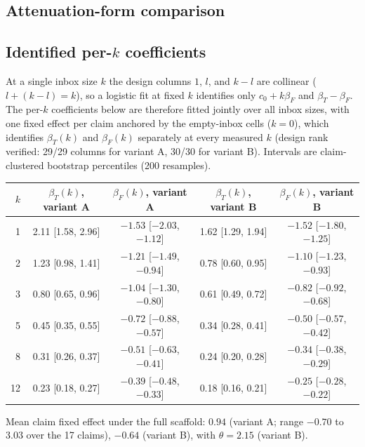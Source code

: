 \documentclass[11pt]{article}
\begin{document}
\subsection{Attenuation-form comparison}
\begin{center}

\end{center}

\subsection{Identified per-$k$ coefficients}

At a single inbox size $k$ the design columns $1$, $l$, and $k-l$ are
collinear ($l + (k-l) = k$), so a logistic fit at fixed $k$ identifies only
$c_0 + k\beta_F$ and $\beta_T - \beta_F$. The per-$k$ coefficients below are
therefore fitted jointly over all inbox sizes, with one fixed effect per claim
anchored by the empty-inbox cells ($k = 0$), which identifies
$\beta_T(k)$ and $\beta_F(k)$ separately at every measured $k$ (design rank
verified: 29/29 columns for variant A, 30/30 for variant B). Intervals are
claim-clustered bootstrap percentiles (200 resamples).

\begin{center}
\small
\begin{tabular}{rcccc}
\toprule
$k$ & $\beta_T(k)$, variant A & $\beta_F(k)$, variant A & $\beta_T(k)$, variant B & $\beta_F(k)$, variant B \\
\midrule
1  & 2.11 [1.58, 2.96] & $-1.53$ [$-2.03$, $-1.12$] & 1.62 [1.29, 1.94] & $-1.52$ [$-1.80$, $-1.25$] \\
2  & 1.23 [0.98, 1.41] & $-1.21$ [$-1.49$, $-0.94$] & 0.78 [0.60, 0.95] & $-1.10$ [$-1.23$, $-0.93$] \\
3  & 0.80 [0.65, 0.96] & $-1.04$ [$-1.30$, $-0.80$] & 0.61 [0.49, 0.72] & $-0.82$ [$-0.92$, $-0.68$] \\
5  & 0.45 [0.35, 0.55] & $-0.72$ [$-0.88$, $-0.57$] & 0.34 [0.28, 0.41] & $-0.50$ [$-0.57$, $-0.42$] \\
8  & 0.31 [0.26, 0.37] & $-0.51$ [$-0.63$, $-0.41$] & 0.24 [0.20, 0.28] & $-0.34$ [$-0.38$, $-0.29$] \\
12 & 0.23 [0.18, 0.27] & $-0.39$ [$-0.48$, $-0.33$] & 0.18 [0.16, 0.21] & $-0.25$ [$-0.28$, $-0.22$] \\
\bottomrule
\end{tabular}
\end{center}

Mean claim fixed effect under the full scaffold: $0.94$ (variant A; range
$-0.70$ to $3.03$ over the 17 claims), $-0.64$ (variant B), with
$\theta = 2.15$ (variant B).
\end{document}
